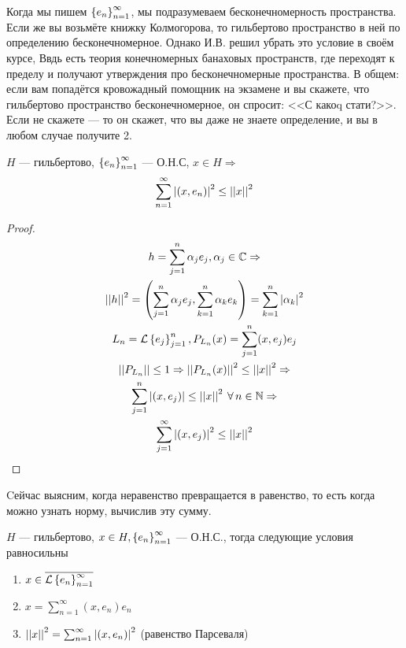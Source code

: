 \documentclass[document]{subfiles}
\begin{document}
Когда мы пишем $\left\{e_n\right\}^\infty_{n=1}$, мы подразумеваем бесконечномерность пространства. Если же вы возьмёте книжку Колмогорова, то гильбертово пространство в ней по определению бесконечномерное. Однако И.В. решил убрать это условие в своём курсе,
Ввдь есть теория конечномерных банаховых пространств, где переходят к пределу
и получают утверждения про бесконечномерные пространства. В общем: если вам попадётся кровожадный помощник на экзамене и вы скажете, что гильбертово пространство бесконечномерное, он спросит: <<С какоq стати?>>. Если не скажете --- то он скажет, что вы даже не знаете определение,
и вы в любом случае получите 2.
\begin{corollary}
    $H$ --- гильбертово, $\left\{e_n\right\}^\infty_{n=1}$ --- О.Н.С, $x \in H \Rightarrow$
    \[ \sum^\infty_{n=1} \left| {(x,e_n)} \right|^2 \leq \left|\left| {x} \right| \right|^2 \] 
\end{corollary}
\begin{proof}
    \begin{gather*}
        h = \sum^n_{j=1} \alpha_j e_j, \alpha_j \in \bC \Rightarrow \\
        \norm{h}^2 = \left( \sum^n_{j=1} \alpha_j e_j, \sum^n_{k=1} \alpha_k e_k \right) = \sum^n_{k=1} \abs{\alpha_k}^2 \\
        L_n = \calL \seq{e_j}^n_{j=1}, P_{L_n}(x) = \sum^n_{j=1} (x, e_j) e_j \\
        \norm{P_{L_n}} \leq 1 \Rightarrow \norm{P_{L_n}(x)}^2 \leq \norm{x}^2 \Rightarrow \\
        \sum^n_{j=1} \abs{(x,e_j)} \leq \norm{x}^2 \: \forall n \in \bN \Rightarrow \\
        \sum^\infty_{j=1} \abs{(x,e_j)}^2 \leq \norm{x}^2
    \end{gather*}
\end{proof}

Cейчас выясним, когда неравенство превращается в равенство, то есть когда можно узнать норму, вычислив эту сумму.


\begin{theorem}
    $H$ --- гильбертово, $x \in H, \left\{e_n\right\}^\infty_{n=1}$ --- О.Н.С., тогда следующие условия равносильны
    \begin{enumerate}
        \item $x \in \overline{\mathcal{L} \left\{e_n\right\}^\infty_{n=1}} $
        \item $x = \sum^\infty_{n=1} (x,e_n) e_n $
        \item $\left|\left| {x} \right| \right|^2 = \sum^\infty_{n=1} \left| {(x,e_n)} \right|^2$ (равенство Парсеваля)
    \end{enumerate}
\end{theorem}
\end{document}
